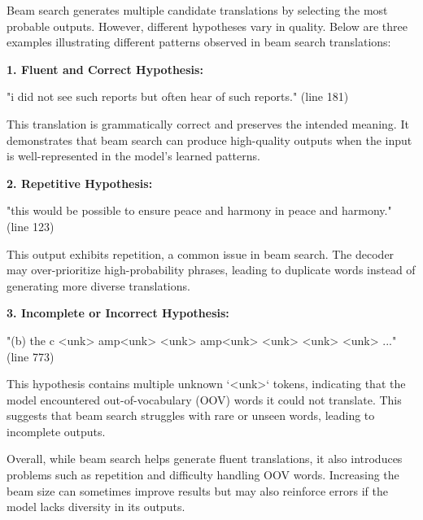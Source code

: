 \begin{parts}
\begin{subparts}
{            Beam search generates multiple candidate translations by selecting the most probable outputs. However, different
            hypotheses vary in quality. Below are three examples illustrating different patterns observed in beam search translations:

            \textbf{1. Fluent and Correct Hypothesis:}

            "i did not see such reports but often hear of such reports." (line 181)

            This translation is grammatically correct and preserves the intended meaning. It demonstrates that beam search
            can produce high-quality outputs when the input is well-represented in the model's learned patterns.

            \textbf{2. Repetitive Hypothesis:}

            "this would be possible to ensure peace and harmony in peace and harmony." (line 123)

            This output exhibits repetition, a common issue in beam search. The decoder may over-prioritize high-probability
            phrases, leading to duplicate words instead of generating more diverse translations.

            \textbf{3. Incomplete or Incorrect Hypothesis:}

            "(b) the c <unk> amp<unk> <unk> amp<unk> <unk> <unk> <unk> ..." (line 773)

            This hypothesis contains multiple unknown `<unk>` tokens, indicating that the model encountered
            out-of-vocabulary (OOV) words it could not translate. This suggests that beam search struggles with rare
            or unseen words, leading to incomplete outputs.

            Overall, while beam search helps generate fluent translations, it also introduces problems such as repetition and
            difficulty handling OOV words. Increasing the beam size can sometimes improve results but may also reinforce
            errors if the model lacks diversity in its outputs.
        }\fi


        
    \end{subparts}




\end{parts}
